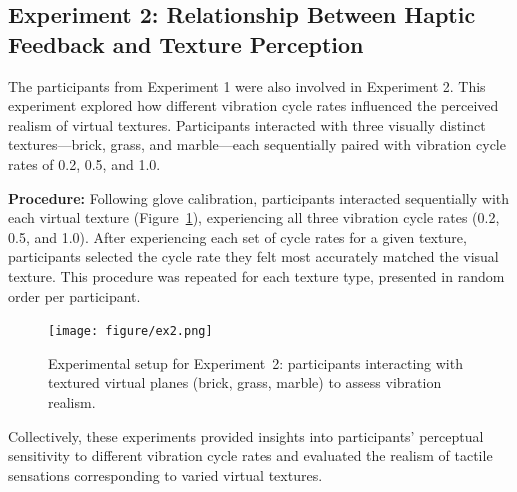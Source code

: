 \documentclass[graybox]{svmult}
\begin{document}
\subsection{Experiment 2: Relationship Between Haptic Feedback and Texture Perception}
The participants from Experiment 1 were also involved in Experiment 2. This experiment explored how different vibration cycle rates influenced the perceived realism of virtual textures. Participants interacted with three visually distinct textures—brick, grass, and marble—each sequentially paired with vibration cycle rates of 0.2, 0.5, and 1.0.

\textbf{Procedure:} Following glove calibration, participants interacted sequentially with each virtual texture (Figure~\ref{fig:experiment2_setup}), experiencing all three vibration cycle rates (0.2, 0.5, and 1.0). After experiencing each set of cycle rates for a given texture, participants selected the cycle rate they felt most accurately matched the visual texture. This procedure was repeated for each texture type, presented in random order per participant.

\begin{figure}\centering
	\texttt{[image: figure/ex2.png]}%
	\caption{Experimental setup for Experiment~2: participants interacting with textured virtual planes (brick, grass, marble) to assess vibration realism.}\label{fig:experiment2_setup}
\end{figure}

Collectively, these experiments provided insights into participants' perceptual sensitivity to different vibration cycle rates and evaluated the realism of tactile sensations corresponding to varied virtual textures.
\end{document}
